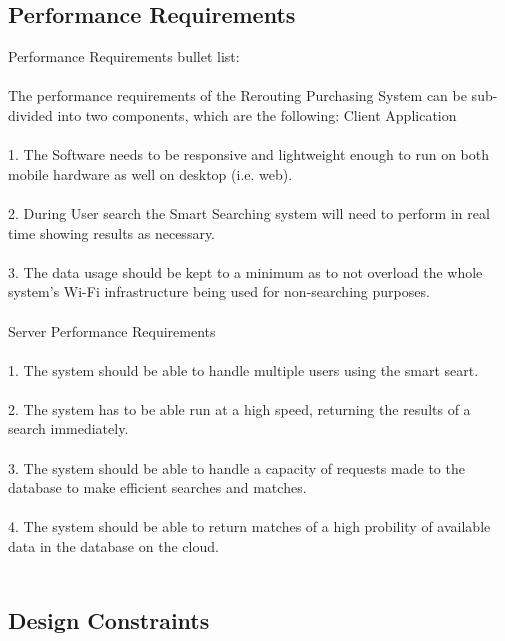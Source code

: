 \documentclass[a4paper,10pt]{article}
\begin{document}
	\subsection{Performance Requirements}
	{Performance Requirements bullet list:\\\\
	The performance requirements of the Rerouting Purchasing System can be sub-divided into two components, which are the following:
	Client Application\\\\
	1.	The Software needs to be responsive and lightweight enough to run on both mobile hardware as well on desktop (i.e. web).\\\\
	2.	During User search the Smart Searching system will need to perform in real time showing results as necessary.\\\\
	3.	The data usage should be kept to a minimum as to not overload the whole system's Wi-Fi infrastructure being used for non-searching purposes.\\\\
	
	Server Performance Requirements\\\\
	1.	The system should be able to handle multiple users using the smart seart.\\\\
	2.	The system has to be able run at a high speed, returning the results of a search immediately.\\\\
	3.	The system should be able to handle a capacity of requests made to the database to make efficient searches and matches. \\\\
	4.	The system should be able to return matches of a high probility of available data in the database on the cloud.\\\\
	
	\subsection{Design Constraints}

}
\end{document}
